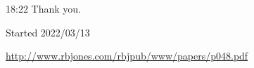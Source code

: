 \documentclass[10pt,titlepage]{article}
\begin{document}
18:22
Thank you.

\cite{pinker-angels}


{}





\tiny{
Started 2022/03/13


\href{http://www.rbjones.com/rbjpub/www/papers/p048.pdf}{http://www.rbjones.com/rbjpub/www/papers/p048.pdf}

}%
\end{document}
